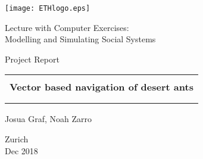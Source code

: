
\thispagestyle{empty}

\begin{center}
\texttt{[image: ETHlogo.eps]}

\bigskip


\bigskip


\bigskip


\LARGE{ 	Lecture with Computer Exercises:\\ }
\LARGE{ Modelling and Simulating Social Systems\\}

\bigskip

\bigskip

\small{Project Report}\\

\bigskip

\bigskip

\bigskip

\bigskip


\begin{tabular}{|c|}
\hline
\\
\textbf{\LARGE{Vector based navigation of desert ants}}\\
\textbf{\LARGE{}}\\
\\
\hline
\end{tabular}
\bigskip

\bigskip

\bigskip

\LARGE{Josua Graf, Noah Zarro}



\bigskip

\bigskip

\bigskip

\bigskip

\bigskip

\bigskip

\bigskip

\bigskip

Zurich\\
Dec 2018\\

\end{center}


